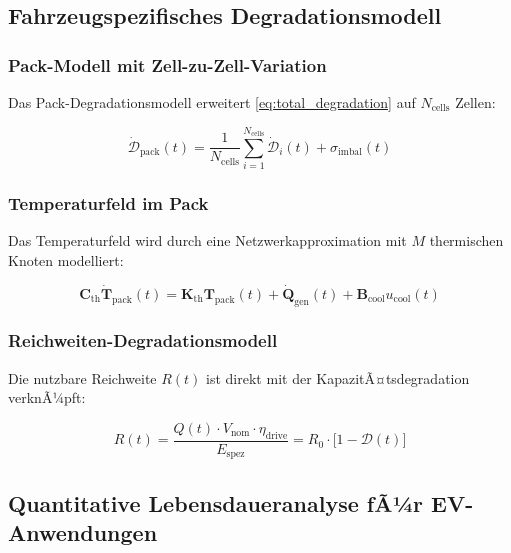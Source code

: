 ﻿\documentclass[12pt,a4paper]{article}
\begin{document}
	\subsection{Fahrzeugspezifisches Degradationsmodell}
	
	\subsubsection{Pack-Modell mit Zell-zu-Zell-Variation}
	
	Das Pack-Degradationsmodell erweitert \eqref{eq:total_degradation} auf
	$N_\mathrm{cells}$ Zellen:
	
	\begin{equation}
		\dot{\mathcal{D}}_\mathrm{pack}(t) = \frac{1}{N_\mathrm{cells}}
		\sum_{i=1}^{N_\mathrm{cells}} \dot{\mathcal{D}}_i(t)
		+ \sigma_\mathrm{imbal}(t)
		\label{eq:pack_degradation}
	\end{equation}
	
	\subsubsection{Temperaturfeld im Pack}
	
	Das Temperaturfeld wird durch eine Netzwerkapproximation mit $M$ thermischen
	Knoten modelliert:
	
	\begin{equation}
		\mathbf{C}_\mathrm{th} \dot{\mathbf{T}}_\mathrm{pack}(t) =
		\mathbf{K}_\mathrm{th} \mathbf{T}_\mathrm{pack}(t) + \dot{\mathbf{Q}}_\mathrm{gen}(t)
		+ \mathbf{B}_\mathrm{cool} u_\mathrm{cool}(t)
		\label{eq:thermal_network_ev}
	\end{equation}
	
	\subsubsection{Reichweiten-Degradationsmodell}
	
	Die nutzbare Reichweite $R(t)$ ist direkt mit der KapazitÃ¤tsdegradation
	verknÃ¼pft:
	
	\begin{equation}
		R(t) = \frac{Q(t) \cdot V_\mathrm{nom} \cdot \eta_\mathrm{drive}}{E_\mathrm{spez}}
		= R_0 \cdot \bigl[1 - \mathcal{D}(t)\bigr]
		\label{eq:range_model}
	\end{equation}
	
	\subsection{Quantitative Lebensdaueranalyse fÃ¼r EV-Anwendungen}
	
\end{document}
